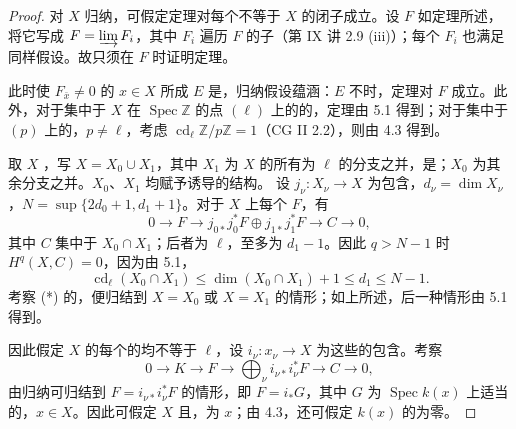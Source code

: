 \begin{proof}
对 $X$ 归纳，可假定定理对每个不等于 $X$ 的闭子成立。设 $F$ 如定理所述，将它写成 $F=\varinjlim F_i$，其中 $F_i$ 遍历 $F$ 的子（第 IX 讲 2.9 (iii)）；每个 $F_i$ 也满足同样假设。故只须在 $F$ 时证明定理。

此时使 $F_{\bar x}\ne0$ 的 $x\in X$ 所成 $E$ 是，归纳假设蕴涵：$E$ 不时，定理对 $F$ 成立。此外，对于集中于 $X$ 在 $\operatorname{Spec}\mathbb Z$ 的点 $(\ell)$ 上的的，定理由 5.1 得到；对于集中于 $(p)$ 上的，$p\ne\ell$，考虑 $\operatorname{cd}_\ell\mathbb Z/p\mathbb Z=1$（CG II 2.2），则由 4.3 得到。

取 $X$ ，写 $X=X_0\cup X_1$，其中 $X_1$ 为 $X$ 的所有为 $\ell$ 的分支之并，是；$X_0$ 为其余分支之并。$X_0$、$X_1$ 均赋予诱导的结构。
设 $j_\nu:X_\nu\to X$ 为包含，$d_\nu=\dim X_\nu$，$N=\sup\{2d_0+1,d_1+1\}$。对于 $X$ 上每个 $F$，有
\begin{equation}
 0\longrightarrow F\longrightarrow j_{0*}j_0^*F\oplus j_{1*}j_1^*F\longrightarrow C\longrightarrow0,\tag{*}
\end{equation}
其中 $C$ 集中于 $X_0\cap X_1$；后者为 $\ell$，至多为 $d_1-1$。因此 $q>N-1$ 时 $H^q(X,C)=0$，因为由 5.1，
\[
 \operatorname{cd}_\ell(X_0\cap X_1)\leq\dim(X_0\cap X_1)+1\leq d_1\leq N-1.
\]
考察 (*) 的，便归结到 $X=X_0$ 或 $X=X_1$ 的情形；如上所述，后一种情形由 5.1 得到。

因此假定 $X$ 的每个的均不等于 $\ell$，设 $i_\nu:x_\nu\to X$ 为这些的包含。考察
\[
 0\longrightarrow K\longrightarrow F\longrightarrow\bigoplus_\nu i_{\nu*}i_\nu^*F\longrightarrow C\longrightarrow0,
\]
由归纳可归结到 $F=i_{\nu*}i_\nu^*F$ 的情形，即 $F=i_*G$，其中 $G$ 为 $\operatorname{Spec}k(x)$ 上适当的，$x\in X$。因此可假定 $X$ 且，为 $x$；由 4.3，还可假定 $k(x)$ 的为零。


\end{proof}
